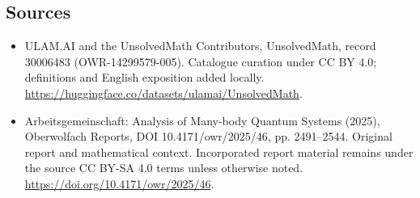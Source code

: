 \documentclass[11pt]{article}
\begin{document}
\subsection{Sources}
\begin{itemize}
\item[\hypertarget{source:30006483:1}{S1}] ULAM.AI and the UnsolvedMath Contributors, UnsolvedMath, record 30006483 (OWR-14299579-005). Catalogue curation under CC BY 4.0; definitions and English exposition added locally.
\url{https://huggingface.co/datasets/ulamai/UnsolvedMath}.
\item[\hypertarget{source:30006483:2}{S2}] Arbeitsgemeinschaft: Analysis of Many-body Quantum Systems (2025), Oberwolfach Reports, DOI 10.4171/owr/2025/46, pp. 2491--2544. Original report and mathematical context. Incorporated report material remains under the source CC BY-SA 4.0 terms unless otherwise noted.
\url{https://doi.org/10.4171/owr/2025/46}.
\end{itemize}
\label{end:30006483}
\end{document}
